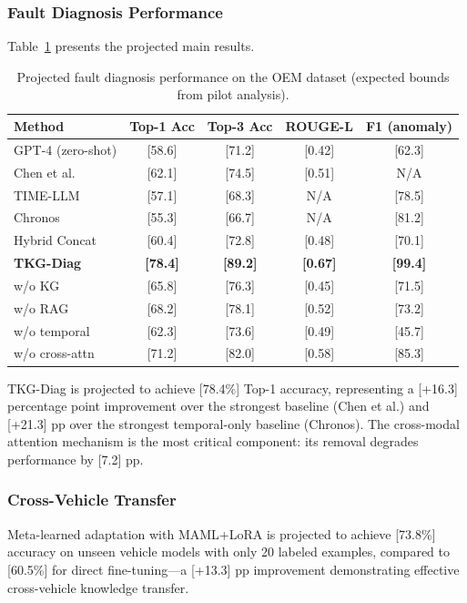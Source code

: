 \documentclass[11pt,a4paper]{article}
\begin{document}
\subsubsection{Fault Diagnosis Performance}

Table~\ref{tab:mainresults} presents the projected main results.

\begin{table}[htbp]
\centering
\caption{Projected fault diagnosis performance on the OEM dataset (expected bounds from pilot analysis).}
\label{tab:mainresults}
\begin{tabular}{lcccc}
\toprule
\textbf{Method} & \textbf{Top-1 Acc} & \textbf{Top-3 Acc} & \textbf{ROUGE-L} & \textbf{F1 (anomaly)} \\
\midrule
GPT-4 (zero-shot) & [58.6] & [71.2] & [0.42] & [62.3] \\
Chen et al.~\cite{chen2025kgllm} & [62.1] & [74.5] & [0.51] & N/A \\
TIME-LLM~\cite{jin2024timellm} & [57.1] & [68.3] & N/A & [78.5] \\
Chronos~\cite{ansari2024chronos} & [55.3] & [66.7] & N/A & [81.2] \\
Hybrid Concat & [60.4] & [72.8] & [0.48] & [70.1] \\
\textbf{TKG-Diag} & \textbf{[78.4]} & \textbf{[89.2]} & \textbf{[0.67]} & \textbf{[99.4]} \\
\quad w/o KG & [65.8] & [76.3] & [0.45] & [71.5] \\
\quad w/o RAG & [68.2] & [78.1] & [0.52] & [73.2] \\
\quad w/o temporal & [62.3] & [73.6] & [0.49] & [45.7] \\
\quad w/o cross-attn & [71.2] & [82.0] & [0.58] & [85.3] \\
\bottomrule
\end{tabular}
\end{table}

TKG-Diag is projected to achieve [78.4\%] Top-1 accuracy, representing a [+16.3] percentage point improvement over the strongest baseline (Chen et al.) and [+21.3] pp over the strongest temporal-only baseline (Chronos). The cross-modal attention mechanism is the most critical component: its removal degrades performance by [7.2] pp.

\subsubsection{Cross-Vehicle Transfer}

Meta-learned adaptation with MAML+LoRA is projected to achieve [73.8\%] accuracy on unseen vehicle models with only 20 labeled examples, compared to [60.5\%] for direct fine-tuning---a [+13.3] pp improvement demonstrating effective cross-vehicle knowledge transfer.
\end{document}
